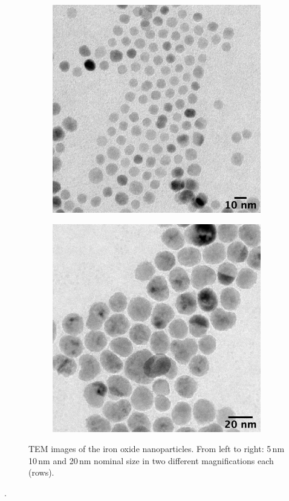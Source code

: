 \begin{figure}[tp]
\begin{subfigure}[b]{0.25\textwidth}
	\end{subfigure}
	\begin{subfigure}[b]{0.25\textwidth}
		\includegraphics[width=\linewidth]{images/temh10.png}
	\end{subfigure}
	\begin{subfigure}[b]{0.25\textwidth}
		\includegraphics[width=\linewidth]{images/temh20.png}
	\end{subfigure}
\caption[TEM images of iron oxide nanoparticle]{TEM images of the iron oxide nanoparticles. From left to right: 5\,nm 10\,nm and 20\,nm nominal size in two different magnifications each (rows).}
\label{fig:tem}
\end{figure}
.


